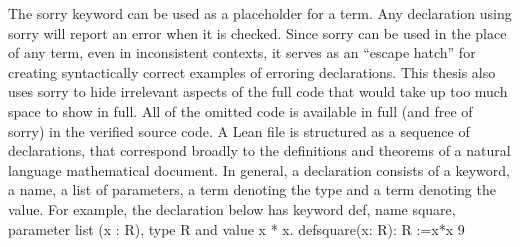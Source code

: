 \documentclass{book}
\theoremstyle{definition}
\begin{document}
The sorry keyword can be used as a placeholder for a term. Any declaration using sorry will report an error when it is checked. Since sorry can be used in the place of any term, even in inconsistent contexts, it serves as an “escape hatch” for creating syntactically correct examples of erroring declarations. This thesis also uses sorry to hide irrelevant aspects of the full code that would take up too much space to show in full. All of the omitted code is available in full (and free of sorry) in the verified source code.
A Lean file is structured as a sequence of declarations, that correspond broadly to the definitions and theorems of a natural language mathematical document. In general, a declaration consists of a keyword, a name, a list of parameters, a term denoting the type and a term denoting the value. For example, the declaration below has keyword def, name square, parameter list (x : R), type R and value x * x.
defsquare(x: R): R :=x*x
9
\end{document}

